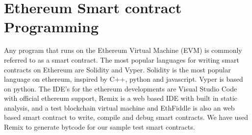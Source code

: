 \section{Ethereum Smart contract Programming}
Any program that runs on the Ethereum Virtual Machine (EVM) is commonly referred to as a smart contract. The most popular languages for writing smart contracts on Ethereum are Solidity and Vyper. Solidity is the most popular language on ethereum, inspired by C++, python and javascript. Vyper is based on python. The IDE's for the ethereum developments are Visual Studio Code with official ethereum support, Remix is a web based IDE with built in static analysis, and a test blockchain virtual machine and EthFiddle is also an web based smart contract to write, compile and debug smart contracts. We have used Remix to generate bytcode for our sample test smart contracts.
